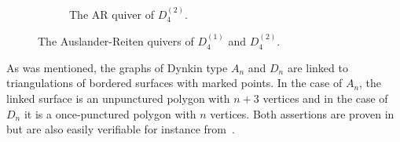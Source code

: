 \documentclass[a4paper,oneside,svgnames]{amsart}
\theoremstyle{plain}
\theoremstyle{definition}
\begin{document}
\begin{figure}[ht]
\begin{subfigure}[b]{\textwidth}
   \caption{The AR quiver of $D_4^{(2)}$.}
  \end{subfigure}
  \caption{The Auslander-Reiten quivers of $D_4^{(1)}$ and $D_4^{(2)}$.}
  \label{fig:quivers-of-D}
 \end{figure}

 As was mentioned, the graphs of Dynkin type $A_n$ and $D_n$ are linked to
 triangulations of bordered surfaces with marked points. In the case of $A_n$,
 the linked surface is an unpunctured polygon with $n + 3$ vertices and in the
 case of $D_n$ it is a once-punctured polygon with $n$ vertices. Both assertions
 are proven in~\cite{fst} but are also easily verifiable for instance
 from~.
\end{document}
